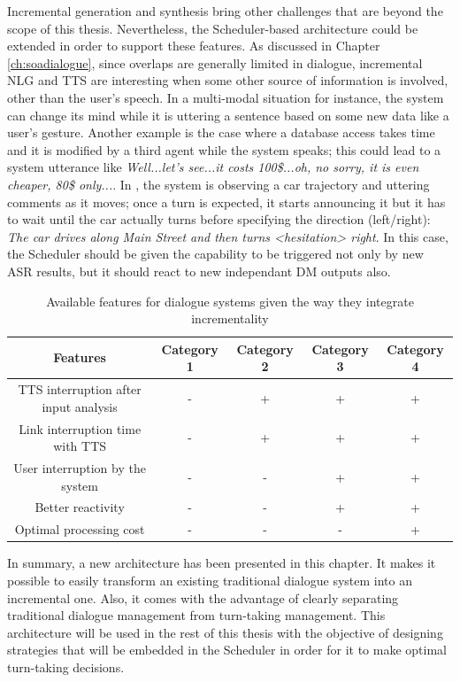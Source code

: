              Incremental generation and synthesis \cite{Baumann2013} bring other challenges that are beyond the scope of this thesis. Nevertheless, the Scheduler-based architecture could be extended in order to support these features. As discussed in Chapter \ref{ch:soadialogue}, since overlaps are generally limited in dialogue, incremental NLG and TTS are interesting when some other source of information is involved, other than the user's speech. In a multi-modal situation for instance, the system can change its mind while it is uttering a sentence based on some new data like a user's gesture. Another example is the case where a database access takes time and it is modified by a third agent while the system speaks; this could lead to a system utterance like \textit{Well...let's see...it costs 100\$...oh, no sorry, it is even cheaper, 80\$ only...}. In \cite{Baumann2013}, the system is observing a car trajectory and uttering comments as it moves; once a turn is expected, it starts announcing it but it has to wait until the car actually turns before specifying the direction (left/right): \textit{The car drives along Main Street and then turns <hesitation> right}. In this case, the Scheduler should be given the capability to be triggered not only by new ASR results, but it should react to new independant DM outputs also.

             \begin{table}[htp]
      	     \footnotesize
             \centering
             \begin{tabular}{|c|c|c|c|c|}
               \hline
               \textbf{Features}	& \textbf{Category 1} & \textbf{Category 2} & \textbf{Category 3} & \textbf{Category 4} \\
               \hline
               TTS interruption after input analysis & - & + & + & + \\
               \hline
               Link interruption time with TTS & - & + & + & + \\
               \hline
               User interruption by the system & - & - & + & + \\
               \hline
               Better reactivity & - & - & + & + \\
               \hline
               Optimal processing cost & - & - & - & + \\
               \hline
             \end{tabular}
             \caption{Available features for dialogue systems given the way they integrate incrementality}
             \label{tab:incrclassif}
             \end{table}

             In summary, a new architecture has been presented in this chapter. It makes it possible to easily transform an existing traditional dialogue system into an incremental one. Also, it comes with the advantage of clearly separating traditional dialogue management from turn-taking management. This architecture will be used in the rest of this thesis with the objective of designing strategies that will be embedded in the Scheduler in order for it to make optimal turn-taking decisions.